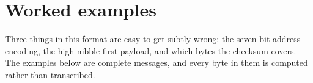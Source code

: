 \chapter{Worked examples}\label{ch:examples}

Three things in this format are easy to get subtly wrong: the seven-bit address encoding,
the high-nibble-first payload, and which bytes the checksum covers. The examples below are
complete messages, and every byte in them is computed rather than transcribed.



